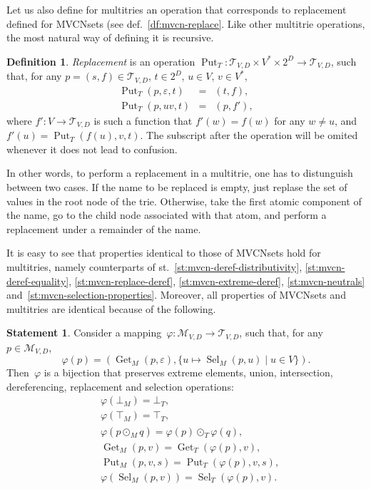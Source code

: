 \documentclass{article}
\theoremstyle{definition}
\newtheorem{Df}{Definition}
\newtheorem{St}{Statement}
\newcommand{\setcharmvcn}{M}
\newcommand{\setcharmt}{T}
\newcommand{\setsymbol}[3]{\mathcal{#1}_{#2,#3}}
\newcommand{\setmvcn}[2]{\setsymbol{\setcharmvcn}{#1}{#2}}
\newcommand{\setmt}[2]{\setsymbol{\setcharmt}{#1}{#2}}
\newcommand{\select}{\operatorname{Sel}}
\newcommand{\deref}{\operatorname{Get}}
\newcommand{\putval}{\operatorname{Put}}
\begin{document}
Let us also define for multitries an operation that corresponds to replacement
defined for MVCNsets (see def.~\ref{df:mvcn-replace}. Like other multitrie
operations, the most natural way of defining it is recursive.
\begin{Df}\label{df:mt-replace}
\emph{Replacement} is an operation $\putval_\setcharmt : \setmt{V}{D}
\times V^\ast \times 2^D \to \setmt{V}{D}$, such that, for any
$p = (s, f) \in \setmt{V}{D}$, $t \in 2^D$, $u \in V$, $v \in V^\ast$,
\begin{eqnarray*}
  \putval_\setcharmt(p, \varepsilon, t) & = & (t, f) , \\
  \putval_\setcharmt(p, u v, t) & = & (p, f') ,
\end{eqnarray*}
where $f' : V \to \setmt{V}{D}$ is such a function that $f'(w) = f(w)$ for any
$w\neq u$, and $f'(u) = \putval_\setcharmt(f(u), v, t)$.
The subscript after the operation will be omited whenever it does not lead to
confusion.
\end{Df}

In other words, to perform a replacement in a multitrie, one has to distunguish
between two cases. If the name to be replaced is empty, just replase the set of
values in the root node of the trie. Otherwise, take the first atomic component
of the name, go to the child node associated with that atom, and perform a
replacement under a remainder of the name.

It is easy to see that properties identical to those of MVCNsets
hold for multitries, namely counterparts of
st.~\ref{st:mvcn-deref-distributivity},
\ref{st:mvcn-deref-equality},
\ref{st:mvcn-replace-deref},
\ref{st:mvcn-extreme-deref},
\ref{st:mvcn-neutrals}
and~\ref{st:mvcn-selection-properties}.
Moreover, all properties of MVCNsets and multitries are identical because
of the following.

\begin{St}\label{st:isomorph}
Consider a mapping~$\varphi: \setmvcn{V}{D} \to \setmt{V}{D}$, such that,
for any~$p\in \setmvcn{V}{D}$,
\[
  \varphi(p) = (
    \deref_\setcharmvcn(p, \varepsilon) ,
    \{ u \mapsto \select_\setcharmvcn(p, u) \mid u\in V \}
  ) .
\]
Then~$\varphi$ is a bijection that preserves
extreme elements, union, intersection, dereferencing, replacement and selection
operations:
\begin{eqnarray*}
  & \varphi(\bot_{\setcharmvcn}) = \bot_{\setcharmt}, \\
  & \varphi(\top_{\setcharmvcn}) = \top_{\setcharmt}, \\
  & \varphi(p \mathbin{\odot_{\setcharmvcn}} q) =
      \varphi(p) \mathbin{\odot_{\setcharmt}} \varphi(q) , \\
  & \deref_{\setcharmvcn}(p, v) =
      \deref_{\setcharmt}(\varphi(p), v) , \\
  & \putval_{\setcharmvcn}(p, v, s) =
      \putval_{\setcharmt}(\varphi(p), v, s) , \\
  & \varphi(\select_{\setcharmvcn}(p, v)) =
      \select_{\setcharmt}(\varphi(p), v) .
\end{eqnarray*}
\end{St}
\end{document}
